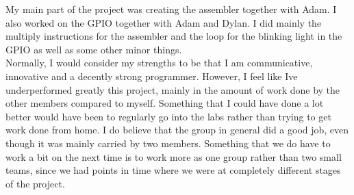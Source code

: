 My main part of the project was creating the assembler together with Adam. I also worked on the GPIO together with Adam and Dylan. I did mainly the multiply instructions for the assembler and the loop for the blinking light in the GPIO as well as some other minor things. 
~\\

Normally, I would consider my strengths to be that I am communicative, innovative and a decently strong programmer. However, I feel like Ive underperformed greatly this project, mainly in the amount of work done by the other members compared to myself. Something that I could have done a lot better would have been to regularly go into the labs rather than trying to get work done from home. I do believe that the group in general did a good job, even though it was mainly carried by two members. Something that we do have to work a bit on the next time is to work more as one group rather than two small teams, since we had points in time where we were at completely different stages of the project. 
